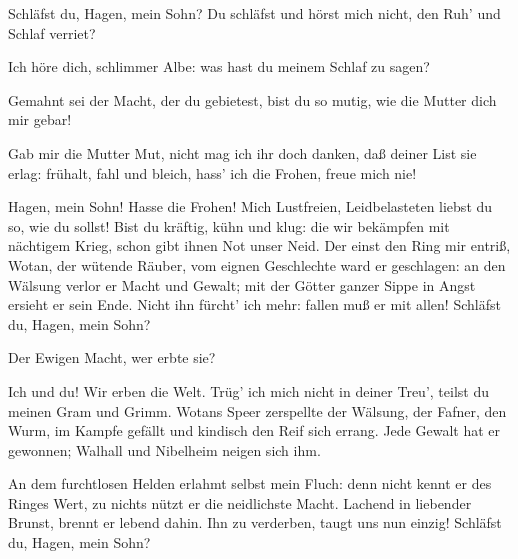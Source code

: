 \begin{drama}
\Alberichspeaks



Schläfst du, Hagen, mein Sohn?
Du schläfst und hörst mich nicht,
den Ruh' und Schlaf verriet?
 

\Hagenspeaks



Ich höre dich, schlimmer Albe:
was hast du meinem Schlaf zu sagen?
 

\Alberichspeaks

Gemahnt sei der Macht,
der du gebietest,
bist du so mutig,
wie die Mutter dich mir gebar!
 

\Hagenspeaks



Gab mir die Mutter Mut,
nicht mag ich ihr doch danken,
daß deiner List sie erlag:
frühalt, fahl und bleich,
hass' ich die Frohen, freue mich nie!
 

\Alberichspeaks



Hagen, mein Sohn! Hasse die Frohen!
Mich Lustfreien, Leidbelasteten
liebst du so, wie du sollst!
Bist du kräftig, kühn und klug:
die wir bekämpfen mit nächtigem Krieg,
schon gibt ihnen Not unser Neid.
Der einst den Ring mir entriß,
Wotan, der wütende Räuber,
vom eignen Geschlechte ward er geschlagen:
an den Wälsung verlor er Macht und Gewalt;
mit der Götter ganzer Sippe
in Angst ersieht er sein Ende.
Nicht ihn fürcht' ich mehr:
fallen muß er mit allen!
Schläfst du, Hagen, mein Sohn?
 

\Hagenspeaks



Der Ewigen Macht, wer erbte sie?
 

\Alberichspeaks

Ich und du! Wir erben die Welt.
Trüg' ich mich nicht in deiner Treu',
teilst du meinen Gram und Grimm.
Wotans Speer zerspellte der Wälsung,
der Fafner, den Wurm, im Kampfe gefällt
und kindisch den Reif sich errang.
Jede Gewalt hat er gewonnen;
Walhall und Nibelheim neigen sich ihm.


An dem furchtlosen Helden
erlahmt selbst mein Fluch:
denn nicht kennt er des Ringes Wert,
zu nichts nützt er die neidlichste Macht.
Lachend in liebender Brunst,
brennt er lebend dahin.
Ihn zu verderben, taugt uns nun einzig!
Schläfst du, Hagen, mein Sohn?
 


\end{drama}
